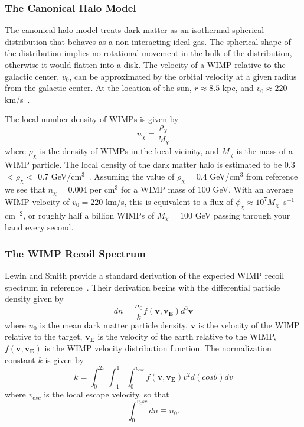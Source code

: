 \subsubsection{The Canonical Halo Model}

The canonical halo model treats dark matter as an isothermal spherical distribution that behaves as a non-interacting ideal gas.  The spherical shape of the distribution implies no rotational movement in the bulk of the distribution, otherwise it would flatten into a disk.  The velocity of a WIMP relative to the galactic center, $v_0$, can be approximated by the orbital velocity at a given radius from the galactic center. At the location of the sun, $r \approx 8.5 $ kpc, and $v_0 \approx 220$ km/s~\cite{Piffl}.

The local number density of WIMPs is given by
\begin{equation}
n_\chi = \frac{\rho_\chi}{M_\chi}
\end{equation}
where $\rho_\chi$ is the density of WIMPs in the local vicinity, and $M_\chi$ is the mass of a WIMP particle. The local density of the dark matter halo is estimated to be 0.3 $< \rho_\chi <$ 0.7 GeV/cm$^{3}$~\cite{Gates}.  Assuming the value of $\rho_{\chi} = 0.4$ GeV/cm$^{3}$ from reference~\cite{Lewin} we see that $n_\chi = 0.004 $ per cm$^3$ for a WIMP mass of 100 GeV.  With an average WIMP velocity of $v_0=220$ km/s, this is equivalent to a flux of $\phi_\chi \approx 10^7 M_\chi $~s$^{-1}$cm$^{-2}$, or roughly half a billion WIMPs of $M_\chi = 100$ GeV passing through your hand every second.


\subsubsection{The WIMP Recoil Spectrum}

Lewin and Smith provide a standard derivation of the expected WIMP recoil spectrum in reference~\cite{Lewin}.  Their derivation begins with the differential particle density given by 
\begin{equation}
dn=\frac{n_0}{k} f(\mathbf{v},\mathbf{v_E}) d^3\mathbf{v}
\end{equation}
where $n_0$ is the mean dark matter particle density, $\mathbf{v}$ is the velocity of the WIMP relative to the target, $\mathbf{v_E}$ is the velocity of the earth relative to the WIMP, $f(\mathbf{v},\mathbf{v_E})$ is the WIMP velocity distribution function.  The normalization constant $k$ is given by
\begin{equation}
k=\int_0^{2\pi}\int_{-1}^{1} \int_0^{v_{esc}}  f(\mathbf{v},\mathbf{v_E}) v^2 d(cos\theta)dv
\end{equation}
where $v_{esc}$ is the local escape velocity, so that 
\begin{equation}
\int_0^{v_esc}dn \equiv n_0.
\end{equation}

